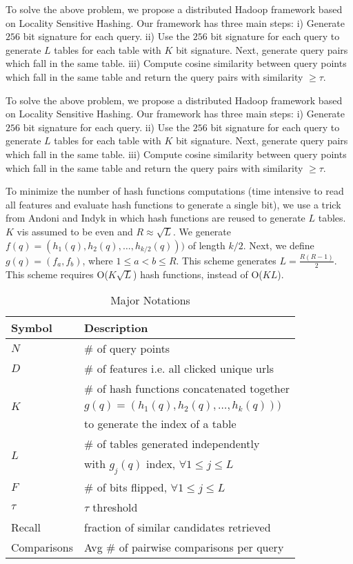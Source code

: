 To solve the above problem, we propose a distributed Hadoop framework based on Locality Sensitive Hashing. 
Our framework has three main steps: 
i) Generate $256$ bit signature for each query.  
ii) Use the $256$ bit signature for each query to generate $L$ tables for each table with $K$ bit signature. 
Next, generate query pairs which fall in the same table.
iii) Compute cosine similarity between query points which fall in the same table and return the query pairs  
with similarity $\geq\tau$.  

To solve the above problem, we propose a distributed Hadoop framework based on Locality Sensitive Hashing. 
Our framework has three main steps: 
i) Generate $256$ bit signature for each query.  
ii) Use the $256$ bit signature for each query to generate $L$ tables for each table with $K$ bit signature. 
Next, generate query pairs which fall in the same table.
iii) Compute cosine similarity between query points which fall in the same table and return the query pairs  
with similarity $\geq\tau$.  



To minimize the number of hash functions computations (time intensive to read all features and 
evaluate hash functions to generate a single bit), we use a trick from Andoni and Indyk  
in which hash functions are reused to generate $L$ tables. $K$ vis assumed to be even and $R \approx	\sqrt L$. 
We generate $f(q)=(h_1(q),h_2(q),\dots,h_{k/2}(q)))$ of length $k/2$. 
Next, we define $g(q)=(f_a,f_b)$, where $1\leq a < b \leq R$. This scheme generates $L= \frac{R (R -1)}{2}$. 
This scheme requires O($K  \sqrt L$) hash functions, instead of O($KL$).    

 \begin{table}
\centering
{
\small \addtolength{\tabcolsep}{-4.5pt}
\begin{tabular}{ll}
\hline
\hline
 \textbf{Symbol} &  \textbf{Description} \\
\hline 
$N$ & \# of query points \\
$D$ & \# of features i.e. all clicked unique urls \\
\hline
\multirow{3}{*}{$K$} & \# of hash functions concatenated together \\ 
   & $g(q)=(h_1(q),h_2(q),\dots,h_k(q)))$ \\ 
	 & to generate the index of a table \\
\hline
 \multirow{2}{*}{$L$} & \# of tables generated independently \\ 
	  &  with $g_j(q)$ index, $\forall 1 \leq j \leq  L$  \\
\hline
$F$ & \# of bits flipped, $\forall 1 \leq j \leq  L$   \\
$\tau$ & $\tau$ threshold \\
Recall & fraction of similar candidates retrieved \\
Comparisons & Avg \# of pairwise comparisons per query  \\
\hline 
\end{tabular}
\caption{\footnotesize{Major Notations}}
}
\label{tab:notation}
\end{table}


